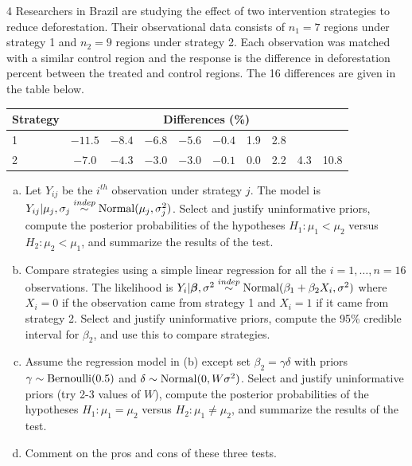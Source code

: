 \documentclass[11pt]{article}
\begin{document}
\begin{problem}{4}
Researchers in Brazil are studying the effect of two intervention strategies to reduce deforestation. Their observational data consists of $n_1=7$ regions under strategy 1 and $n_2=9$ regions under strategy 2. Each observation was matched with a similar control region and the response is the difference in deforestation percent between the treated and control regions. The 16 differences are given in the table below.
\begin{center}
\small
\begin{tabular}{l|ccccccccc}\toprule
Strategy & \multicolumn{9}{c}{Differences (\%)}\\\midrule
1 & $-11.5$ & $-8.4$ & $-6.8$ & $-5.6$ & $-0.4$ & 1.9 & 2.8 & & \\
2 & $-7.0$ & $-4.3$ & $-3.0$ & $-3.0$ & $-0.1$ & 0.0 & 2.2 & 4.3 & 10.8\\\bottomrule
\end{tabular}
\end{center}
\begin{enumerate}[(a)]
\item Let $Y_{ij}$ be the $i^{th}$ observation under strategy $j$. The model is $Y_{ij}|\mu_j,\sigma_j\overset{indep}{\sim}\mathrm{Normal}(\mu_j,\sigma_j^2)$. Select and justify uninformative priors, compute the posterior probabilities of the hypotheses $H_1:\mu_1<\mu_2$ versus $H_2:\mu_2<\mu_1$, and summarize the results of the test.
\item Compare strategies using a simple linear regression for all the $i=1,\dots,n=16$ observations. The likelihood is $Y_i|\bm\beta,\sigma^2\overset{indep}{\sim}\mathrm{Normal}(\beta_1+\beta_2X_i,\sigma^2)$ where $X_i=0$ if the observation came from strategy 1 and $X_i=1$ if it came from strategy 2. Select and justify uninformative priors, compute the 95\% credible interval for $\beta_2$, and use this to compare strategies.
\item Assume the regression model in (b) except set $\beta_2=\gamma\delta$ with priors $\gamma\sim\mathrm{Bernoulli}(0.5)$ and $\delta\sim\mathrm{Normal}(0,W\sigma^2)$. Select and justify uninformative priors (try 2-3 values of $W$), compute the posterior probabilities of the hypotheses $H_1:\mu_1=\mu_2$ versus $H_2:\mu_1\neq\mu_2$, and summarize the results of the test.
\item Comment on the pros and cons of these three tests.
\end{enumerate}
\end{problem}
\end{document}
